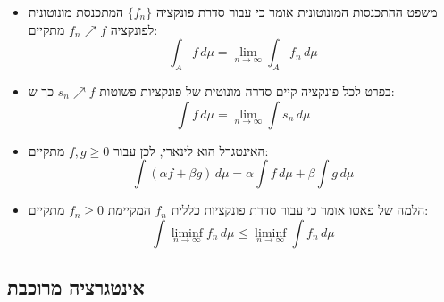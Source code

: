 \documentclass{tstextbook}
\begin{document}
\begin{summary}
  \begin{itemize}
    \item משפט ההתכנסות המונוטונית אומר כי עבור סדרת פונקציה \(\{ f_{n} \}\) המתכנסת מונוטונית לפונקציה \(f_n \nearrow f\) מתקיים:
$$\int_A f \, d\mu = \lim_{n \to \infty} \int_A f_n \, d\mu$$
    \item בפרט לכל פונקציה קיים סדרה מונוטית של פונקציות פשוטות \(s_n \nearrow f\) כך ש:
$$\int f \, d\mu = \lim_{n \to \infty} \int s_n \, d\mu$$
    \item האינטגרל הוא לינארי, לכן עבור \(f,g \geq 0\) מתקיים:
$$\int \left( \alpha f+\beta g \right) \, d\mu = \alpha\int f \, d\mu + \beta\int g \, d\mu$$
    \item הלמה של פאטו אומר כי עבור סדרת פונקציות כללית \(f_{n}\) המקיימת \(f_n \geq 0\) מתקיים:
$$\int \liminf_{n \to \infty} f_n \, d\mu \leq \liminf_{n \to \infty} \int f_n \, d\mu$$
  \end{itemize}
\end{summary}
\subsection{אינטגרציה מרוכבת}
\end{document}

